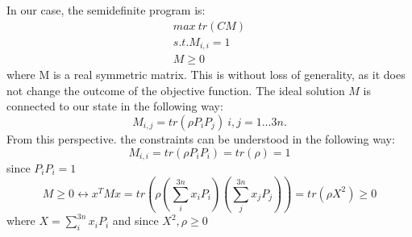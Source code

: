 In our case, the semidefinite program is:
\begin{align*}
max ~ tr\left( CM \right)\\
s.t. M_{i,i} = 1 \\
M \ge 0
\end{align*}
where M is a real symmetric matrix.
This is without loss of generality, as it does not change the outcome of the objective function. 
The ideal solution $M$ is connected to our state in the following way:\cite{gharibian19}
\[
	M_{i,j} = tr\left( \rho P_{i}P_j \right) ~ i,j=1\ldots 3n
.\]
From this perspective. the constraints can be understood in the following way:
$$M_{i,i}=tr\left( \rho P_i P_i\right) = tr\left( \rho\right) = 1  $$ since $P_iP_i=1$
$$M\ge 0\leftrightarrow x^TMx=tr\left(\rho\left(\sum_{i}^{3n} x_iP_i\right)\left(\sum_{j}^{3n} x_jP_j\right)\right)=tr\left(\rho X^2\right)\ge 0$$ where $X=\sum_{i}^{3n} x_iP_i$ and since $X^2,\rho\ge 0$
